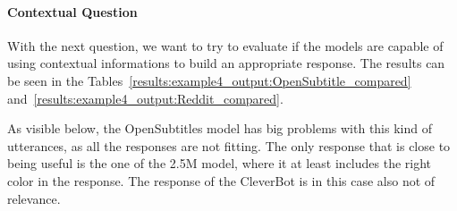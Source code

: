 \paragraph{Contextual Question} 
With the next question, we want to try to evaluate if the models are capable of using contextual informations to build an appropriate response. The results can be seen in the Tables~\ref{results:example4_output:OpenSubtitle_compared} and~\ref{results:example4_output:Reddit_compared}.

As visible below, the OpenSubtitles model has big problems with this kind of utterances, as all the responses are not fitting. The only response that is close to being useful is the one of the 2.5M model, where it at least includes the right color in the response. The response of the CleverBot is in this case also not of relevance.

